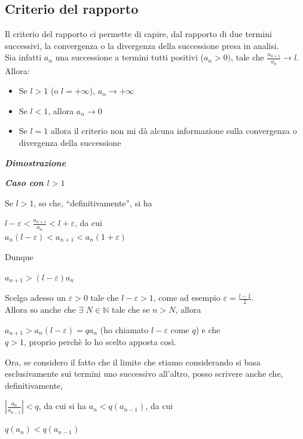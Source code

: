 \documentclass{article}
\theoremstyle{definition}
\newcommand{\virgolette}[1]{``#1''}
\begin{document}
\subsection{Criterio del rapporto}
Il criterio del rapporto ci permette di capire, dal rapporto di due termini successivi, la convergenza o la divergenza della successione presa in analisi.
\\
Sia infatti $a_n$ una successione a termini tutti positivi ($a_n >0)$, tale che $\frac{a_{n+1}}{a_n} \longrightarrow l$.
\\
Allora:
\begin{itemize}
    \item Se $l>1$ (o $l= +\infty$), $a_n \longrightarrow +\infty$
    \item Se $l <1$, allora $a_n \longrightarrow 0$
    \item Se $l=1$ allora il criterio non mi dà alcuna informazione sulla convergenza o divergenza della successione
\end{itemize}
\begin{center}
    \textbf{\textit{Dimostrazione}}
\end{center}
    \begin{center}
        \textbf{\textit{Caso con $l>1$}}
    \end{center}
Se $l>1$, so che, \virgolette{definitivamente}, si ha
\begin{center}
    $l-\varepsilon < \frac{a_{n+1}}{a_n}<l+\varepsilon$, da cui
    \\ $a_n(l-\varepsilon)<a_{n+1}<a_n(1+\varepsilon)$
\end{center}
Dunque
\begin{center}
    $a_{n+1}>(l-\varepsilon)a_n$
\end{center}
Scelgo adesso un $\varepsilon>0$ tale che $l-\varepsilon>1$, come ad esempio $\varepsilon=\frac{l-1}{2}$.
\\
Allora so anche che $\exists$ $N \in \mathbb{N}$ tale che se $n >N$, allora
\begin{center}
    $a_{n+1}>a_n(l-\varepsilon)=qa_n$ (ho chiamato $l-\varepsilon$ come $q$) e che
    \\
    $q>1$, proprio perchè lo ho scelto apposta così.
\end{center}
Ora, se considero il fatto che il limite che stiamo considerando si basa esclusivamente sui termini uno successivo all'altro, posso scrivere anche che, definitivamente,
\begin{center}
    $|\frac{a_n}{a_{n-1}}|<q$, da cui si ha $a_n < q(a_{n-1})$, da cui
    \begin{center}
        $q(a_n)<q(a_{n-1})$
    \end{center}
\end{center}
\end{document}

